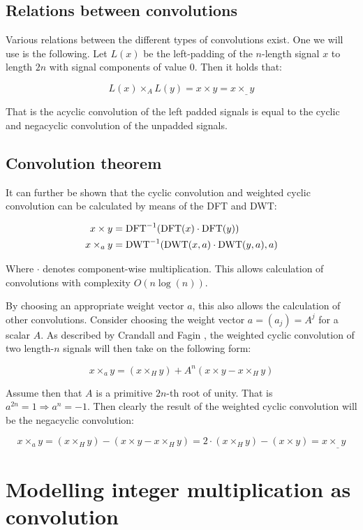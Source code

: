 \subsection{Relations between convolutions}

Various relations between the different types of convolutions exist. One we
will use is the following. Let $L(x)$ be the left-padding of the $n$-length
signal $x$ to length $2n$ with signal components of value $0$. Then it holds
that: \autocite{crandallPrimeNumbersComputational2005}

\[
		L(x) \times_A L(y) = x \times y = x \times_\_ y
\]

That is the acyclic convolution of the left padded signals is equal to the
cyclic and negacyclic convolution of the unpadded signals.

\subsection{Convolution theorem}

It can further be shown that the cyclic convolution and weighted cyclic
convolution can be calculated by means of the DFT and DWT:
\autocite{crandallPrimeNumbersComputational2005}

\begin{align*}
		x \times y & = \operatorname{DFT}^{-1}(\operatorname{DFT}(x) \cdot \operatorname{DFT}(y)) \\
		x \times_a y & = \operatorname{DWT}^{-1}(\operatorname{DWT}(x, a) \cdot \operatorname{DWT}(y, a), a)
\end{align*}

Where $\cdot$ denotes component-wise multiplication. This allows calculation of
convolutions with complexity $O(n \log(n))$.

By choosing an appropriate weight vector $a$, this also allows the calculation
of other convolutions. Consider choosing the weight vector $a = (a_j) = A^j$
for a scalar $A$. As described by Crandall and Fagin
\autocite{crandallDiscreteWeightedTransforms1994}, the weighted cyclic
convolution of two length-$n$ signals will then take on the following form:

\[
		x \times_a y = (x \times_H y)  + A^n (x \times y - x \times_H y)
\]

Assume then that $A$ is a primitive $2n$-th root of unity. That is $a^{2n} = 1
\Rightarrow a^n = -1$. Then clearly the result of the weighted cyclic
convolution will be the negacyclic convolution:

\[
		x \times_a y = (x \times_H y) - (x \times y - x \times_H y) = 2 \cdot (x \times_H y) - (x \times y) = x \times_\_ y
\]

\section{Modelling integer multiplication as convolution}
